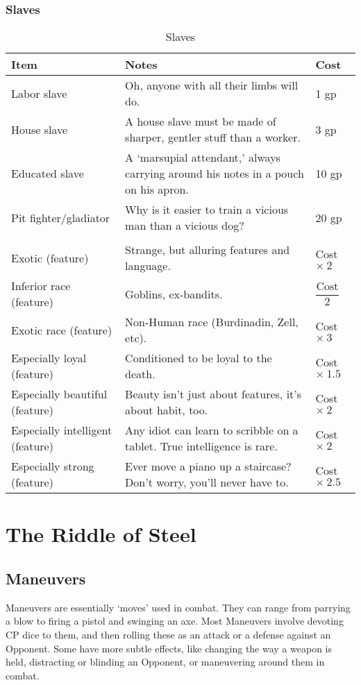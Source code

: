 \documentclass[oneside,11pt,english]{book}
\begin{document}
\section{Slaves}
\begin{table}[hb]
	\centering
	\caption{Slaves}
	\label{tab:Slaves}
	\begin{tabu} spread 0pt {*{3}{X[-1]}}
		Item &Notes &Cost\\\toprule
Labor slave &Oh, anyone with all their limbs will do. &1 gp\\
House slave &A house slave must be made of sharper, gentler stuff than a worker. &3 gp\\
Educated slave &A ‘marsupial attendant,’ always carrying around his notes in a pouch on his apron. &10 gp\\
Pit fighter/gladiator &Why is it easier to train a vicious man than a vicious dog? &20 gp\\
	\\
Exotic (feature) &Strange, but alluring features and language. &Cost $\times\ 2 $\\
Inferior race (feature) &Goblins, ex-bandits. &$ \dfrac{\text{Cost}}{2} $\\
Exotic race (feature) &Non-Human race (Burdinadin, Zell, etc). &Cost $ \times\ 3$\\
Especially loyal (feature) &Conditioned to be loyal to the death. &Cost $ \times\ 1.5 $\\
Especially beautiful (feature) &Beauty isn’t just about features, it’s about habit, too. &Cost $ \times\ 2 $\\
Especially intelligent (feature) &Any idiot can learn to scribble on a tablet. True intelligence is rare. &Cost $ \times\ 2 $\\
Especially strong (feature) &Ever move a piano up a staircase? Don’t worry, you’ll never have to. &Cost $ \times\ 2.5 $\\
	\end{tabu}
\end{table}
\part[Game Mechanics]{The Riddle of Steel}

\chapter{Maneuvers}\label{ch:Maneuvers} %
\startcontents[chapters]
\clearpage
Maneuvers are essentially ‘moves’ used in combat. They can range from parrying a blow to firing a pistol and swinging an axe. Most Maneuvers involve devoting CP dice to them, and then rolling these as an attack or a defense against an Opponent. Some have more subtle effects, like changing the way a weapon is held, distracting or blinding an Opponent, or maneuvering around them in combat.
\end{document}
